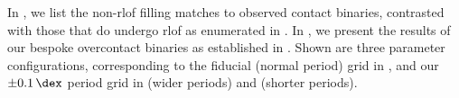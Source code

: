\label{chap:appendix:bespoke_models}

In , we list the non-\acrshort{rlof} filling matches to observed contact binaries, contrasted with those that do undergo \gls{rlof} as enumerated in . In , we present the results of our bespoke overcontact binaries as established in . Shown are three parameter configurations, corresponding to the fiducial (normal period) grid in , and our $\pm\SI{0.1}{\dex}$ period grid in  (wider periods) and  (shorter periods).

